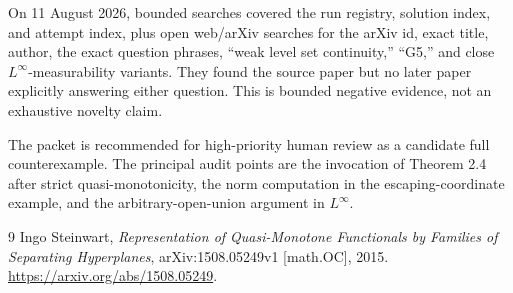 \documentclass[11pt]{article}
\newcommand{\1}{\mathbf 1}
\begin{document}
On 11 August 2026, bounded searches covered the run registry, solution index,
and attempt index, plus open web/arXiv searches for the arXiv id, exact title,
author, the exact question phrases, ``weak level set continuity,'' ``G5,'' and
close $L^\infty$-measurability variants.  They found the source paper but no
later paper explicitly answering either question.  This is bounded negative
evidence, not an exhaustive novelty claim.

The packet is recommended for high-priority human review as a candidate full
counterexample.  The principal audit points are the invocation of Theorem 2.4
after strict quasi-monotonicity, the norm computation in the escaping-coordinate
example, and the arbitrary-open-union argument in $L^\infty$.

\begin{thebibliography}{9}
Ingo Steinwart,
\emph{Representation of Quasi-Monotone Functionals by Families of Separating
Hyperplanes}, arXiv:1508.05249v1 [math.OC], 2015.
\url{https://arxiv.org/abs/1508.05249}.
\end{thebibliography}
\end{document}
